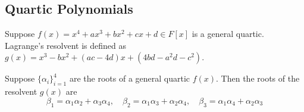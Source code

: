 \subsection*{Quartic Polynomials}

\begin{definition}
    Suppose \(f(x) = x^4 + ax^3 + bx^2 + cx + d \in F[x]\) is a general quartic.
    Lagrange's resolvent is defined as
    \(g(x) = x^3 - bx^2 + (ac-4d)x + (4bd-a^2d-c^2)\).
\end{definition}
\begin{proposition}
    Suppose \({\{\alpha_i\}}_{i=1}^4\) are the roots of a general quartic \(f(x)\).
    Then the roots of the resolvent \(g(x)\) are
    \begin{equation*}
        \beta_1 = \alpha_1\alpha_2 + \alpha_3\alpha_4,\quad
        \beta_2 = \alpha_1\alpha_3 + \alpha_2\alpha_4,\quad
        \beta_3 = \alpha_1\alpha_4 + \alpha_2\alpha_3
    \end{equation*}
\end{proposition}

